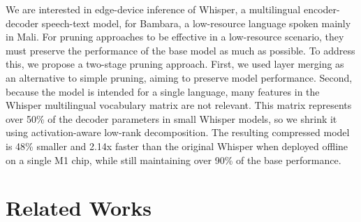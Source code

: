 \documentclass{article}
\begin{document}
We are interested in edge-device inference of Whisper, a multilingual encoder-decoder speech-text model, for Bambara, a low-resource language spoken mainly in Mali. For pruning approaches to be effective in a low-resource scenario, they must preserve the performance of the base model as much as possible. To address this, we propose a two-stage pruning approach. First, we used layer merging as an alternative to simple pruning, aiming to preserve model performance. Second, because the model is intended for a single language, many features in the Whisper multilingual vocabulary matrix are not relevant. This matrix represents over 50\% of the decoder parameters in small Whisper models, so we shrink it using activation-aware low-rank decomposition. The resulting compressed model is 48\% smaller and 2.14x faster than the original Whisper when deployed offline on a single M1 chip, while still maintaining over 90\% of the base performance.
\section{Related Works}
\end{document}
